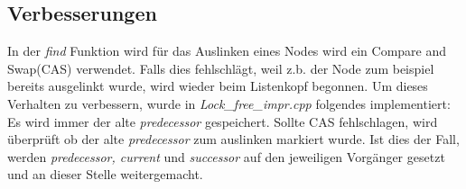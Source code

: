 \documentclass[10pt,a4paper,titlepage,oneside]{article}
\begin{document}
\subsection{Verbesserungen}
In der \textit{find} Funktion wird für das Auslinken eines Nodes wird ein Compare and Swap(CAS) verwendet. Falls dies fehlschlägt, 
weil z.b. der Node zum beispiel bereits ausgelinkt wurde,
wird wieder beim Listenkopf begonnen. Um dieses Verhalten zu verbessern, wurde in \textit{Lock\_free\_impr.cpp} folgendes implementiert:\\
Es wird immer der alte \textit{predecessor} gespeichert. Sollte CAS fehlschlagen, wird überprüft ob der alte \textit{predecessor}
zum auslinken markiert wurde. Ist dies der Fall, werden \textit{predecessor, current} und \textit{successor} auf den jeweiligen Vorgänger
gesetzt und an dieser Stelle weitergemacht. 

 
 

	


		
\end{document}
